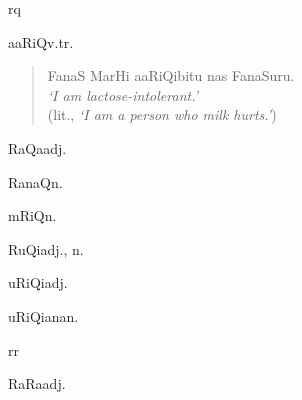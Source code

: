 \begin{multicols*}{2}
\begin{dictroot}{r}{q}
\begin{dictentry}{aaRiQ}{v.tr.}
{            \begin{quote}
                FanaS MarHi aaRiQibitu nas FanaSuru.\\
                \textit{`I am lactose-intolerant.'}\\
                (lit., \textit{`I am a person who milk hurts.'})
            \end{quote}
        }
    \end{dictentry}
    \begin{dictentry}{RaQa}{adj.}
    \end{dictentry}
    \begin{dictentry}{RanaQ}{n.}
    \end{dictentry}
    \begin{dictentry}{mRiQ}{n.}
    \end{dictentry}
    \begin{dictentry}{RuQi}{adj., n.}
    \end{dictentry}
    \begin{dictentry}{uRiQi}{adj.}
    \end{dictentry}
    \begin{dictentry}{uRiQiana}{n.}
    \end{dictentry}
\end{dictroot}

\begin{dictroot}{r}{r}
    \begin{dictentry}{RaRa}{adj.}
    \end{dictentry}
\end{dictroot}


\end{multicols*}
